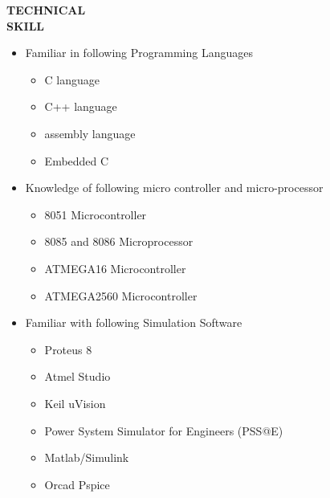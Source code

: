 \documentclass{article}
\begin{document}
	   \begin{flushleft}
	   	\vspace{1.15in}
	   	\textbf{TECHNICAL  \\ SKILL}
	   	\begin{itemize}
	   		\vspace{-0.45in}
	   		\addtolength{\itemindent}{1.359in}
	   		\item  Familiar in following Programming Languages 
	   		{\begin{itemize}
	   				\addtolength{\itemindent}{1.359in}
	   				\item C language
	   				\item C++ language
	   				\item assembly language
	   				\item Embedded C 	
	   			\end{itemize}
	   		}  
	   		\item Knowledge of following micro controller and micro-processor
	   		{\begin{itemize}
	   				\addtolength{\itemindent}{1.359in}
	   				\item 8051 Microcontroller 
	   				\item 8085 and 8086 Microprocessor
	   				\item ATMEGA16 Microcontroller
	   				\item ATMEGA2560 Microcontroller	
	   			\end{itemize}
	   		}  
	   		
	   		\item Familiar with following Simulation Software
	   		{\begin{itemize}
	   				\addtolength{\itemindent}{1.359in}
	   				\item Proteus 8 
	   				\item Atmel Studio
	   				\item Keil uVision
	   				\item Power System Simulator for Engineers (PSS@E)
	   				\item Matlab/Simulink 
	   				\item Orcad Pspice 	
	   			\end{itemize}
	   		} 
	   	\end{itemize}
	   \end{flushleft}
	   
	   
	
\end{document}
